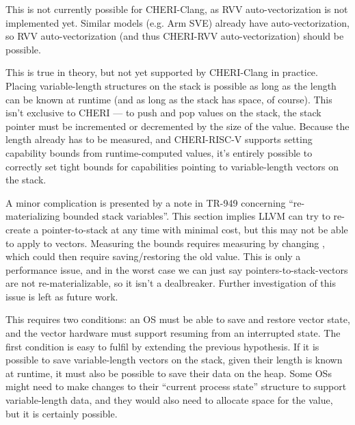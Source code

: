 This is not currently possible for CHERI-Clang, as RVV auto-vectorization is not implemented yet.
Similar models (e.g. Arm SVE) already have auto-vectorization, so RVV auto-vectorization (and thus CHERI-RVV auto-vectorization) should be possible.

This is true in theory, but not yet supported by CHERI-Clang in practice.
Placing variable-length structures on the stack is possible as long as the length can be known at runtime (and as long as the stack has space, of course).
This isn't exclusive to CHERI --- to push and pop values on the stack, the stack pointer must be incremented or decremented by the size of the value.
Because the length already has to be measured, and CHERI-RISC-V supports setting capability bounds from runtime-computed values, it's entirely possible to correctly set tight bounds for capabilities pointing to variable-length vectors on the stack.


A minor complication is presented by a note in TR-949\cite[Section 3.8.2]{TR-949} concerning ``re-materializing bounded stack variables''.
This section implies LLVM can try to re-create a pointer-to-stack at any time with minimal cost, but this may not be able to apply to vectors.
Measuring the bounds requires measuring  by changing , which could then require saving/restoring the old value.
This is only a performance issue, and in the worst case we can just say pointers-to-stack-vectors are not re-materializable, so it isn't a dealbreaker.
Further investigation of this issue is left as future work.

This requires two conditions: an OS must be able to save and restore vector state, and the vector hardware must support resuming from an interrupted state.
The first condition is easy to fulfil by extending the previous hypothesis. 
If it is possible to save variable-length vectors on the stack, given their length is known at runtime, it must also be possible to save their data on the heap.
Some OSs might need to make changes to their ``current process state'' structure to support variable-length data, and they would also need to allocate space for the  value, but it is certainly possible.

